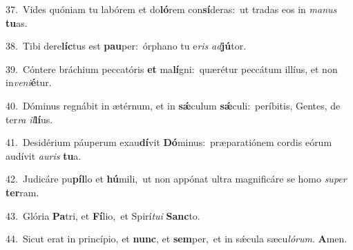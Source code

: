 {\numbfont\textcolor{\numbcolor}{37.}}~Vides quóniam tu labórem et do\-\textbf{ló}\-rem con\-\textbf{sí}\-deras:~\star ut tradas eos in \textit{ma}\-\textit{nus} \textbf{tu}\-as.\par
{\numbfont\textcolor{\numbcolor}{38.}}~Tibi dere\-\textbf{líc}\-tus est \textbf{pau}\-per:~\star órphano tu e\textit{ris} \textit{ad}\-\textbf{jú}tor.\par
{\numbfont\textcolor{\numbcolor}{39.}}~Cóntere bráchium peccatóris \textbf{et} ma\-\textbf{lí}\-gni:~\star quærétur peccátum illíus, et non in\-\textit{ve}\-\textit{ni}\textbf{é}tur.\par
{\numbfont\textcolor{\numbcolor}{40.}}~Dóminus regnábit in ætérnum, et in \textbf{sǽ}\-culum \textbf{sǽ}\-culi:~\star períbitis, Gentes, de ter\textit{ra} \textit{il}\-\textbf{lí}us.\par
{\numbfont\textcolor{\numbcolor}{41.}}~Desidérium páuperum exau\-\textbf{dí}\-vit \textbf{Dó}\-minus:~\star præparatiónem cordis eórum audívit \textit{au}\-\textit{ris} \textbf{tu}\-a.\par
{\numbfont\textcolor{\numbcolor}{42.}}~Judicáre pu\-\textbf{píl}\-lo et \textbf{hú}\-mili,~\star ut non appónat ultra magnificáre se homo \textit{su}\-\textit{per} \textbf{ter}\-ram.\par
{\numbfont\textcolor{\numbcolor}{43.}}~Glória \textbf{Pa}\-tri, et \textbf{Fí}\-lio,~\star et Spirí\-\textit{tu}\-\textit{i} \textbf{Sanc}\-to.\par
{\numbfont\textcolor{\numbcolor}{44.}}~Sicut erat in princípio, et \textbf{nunc}\-, et \textbf{sem}\-per,~\star et in sǽcula sæcu\-\textit{ló}\-\textit{rum}. \textbf{A}\-men.\par
